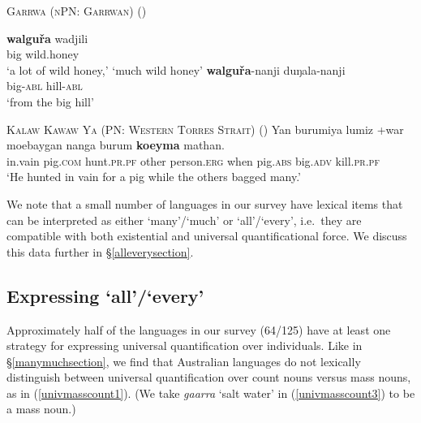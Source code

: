 \documentclass[12pt,egregdoesnotlikesansseriftitles]{scrartcl}
\makeatletter
\newcommand{\ofy}{/125} %
\makeatother
\begin{document}
\begin{exe}
  \ex \textsc{Garrwa (nPN: Garrwan)} (\citealt{furby77}) \label{bigquant1}
  \begin{xlist}
    \ex \gll \textbf{walgu\v{r}a} wadjili \\
    big wild.honey\\
    \glt `a lot of wild honey,' `much wild honey' %
    \ex \gll \textbf{walgu\v{r}a}-nanji duŋala-nanji\\
    big-\textsc{abl} hill-\textsc{abl}\\
    \glt `from the big hill' %
\end{xlist}    
  \ex \textsc{Kalaw Kawaw Ya (PN: Western Torres Strait)} (\citealt[141]{fo91}) \label{bigquant2}
  \gll Yan burumiya lumiz +war moebaygan nanga burum        \textbf{koeyma}    mathan.\\
  in.vain pig.\textsc{com} hunt.\textsc{pr.pf} other person.\textsc{erg} when   pig.\textsc{abs}    big.\textsc{adv}    kill.\textsc{pr.pf}\\
  \glt `He hunted in vain for a pig while the others bagged many.'
  
\end{exe}

We note  that a small number of languages in our survey have lexical items that can be interpreted as either `many'/`much' or `all'/`every', i.e.\ they are compatible with both existential and universal quantificational force. We discuss this data further in \S\ref{alleverysection}.

\subsection{Expressing `all'/`every' \label{alleverysection}}

Approximately half of the languages in our survey (64\ofy) have at least one strategy for expressing universal quantification over individuals. Like in \S\ref{manymuchsection}, we find that Australian languages do not lexically distinguish between universal quantification over count nouns versus mass nouns, as in (\ref{univmasscount1}). (We take \textit{gaarra} `salt water' in (\ref{univmasscount3}) to be a mass noun.)
\end{document}
